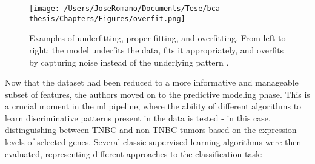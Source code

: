 \begin{figure} [h]
  \centering
  \texttt{[image: /Users/JoseRomano/Documents/Tese/bca-thesis/Chapters/Figures/overfit.png]}
  \caption{Examples of underfitting, proper fitting, and overfitting.
    From left to right: the model underfits the data, fits it appropriately, and overfits by capturing noise instead of the underlying pattern \cite{overfiting_ailab_mti_image}.}
  \label{fig:overfitting}
\end{figure}

Now that the dataset had been reduced to a more informative and manageable
subset of features, the authors moved on to the predictive modeling phase. This
is a crucial moment in the \gls{ml} pipeline, where the ability of different
algorithms to learn discriminative patterns present in the data is tested - in
this case, distinguishing between TNBC and non-TNBC tumors based on the
expression levels of selected genes. Several classic supervised learning
algorithms were then evaluated, representing different approaches to the
classification task:

